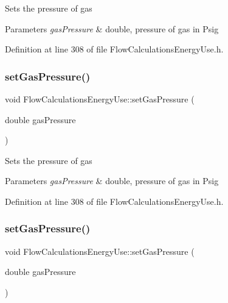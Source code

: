 Sets the pressure of gas


\begin{DoxyParams}{Parameters}
{\em gas\+Pressure} & double, pressure of gas in Psig \\
\hline
\end{DoxyParams}


Definition at line 308 of file Flow\+Calculations\+Energy\+Use.\+h.

\mbox{\label{class_flow_calculations_energy_use_a3b87a7c24340c618ed62ced5aece36b2}} 
\subsubsection{\texorpdfstring{set\+Gas\+Pressure()}{setGasPressure()}\hspace{0.1cm}{\footnotesize\ttfamily [2/3]}}
{\footnotesize\ttfamily void Flow\+Calculations\+Energy\+Use\+::set\+Gas\+Pressure (\begin{DoxyParamCaption}\item[{double}]{gas\+Pressure }\end{DoxyParamCaption})\hspace{0.3cm}{\ttfamily [inline]}}

Sets the pressure of gas


\begin{DoxyParams}{Parameters}
{\em gas\+Pressure} & double, pressure of gas in Psig \\
\hline
\end{DoxyParams}


Definition at line 308 of file Flow\+Calculations\+Energy\+Use.\+h.

\mbox{\label{class_flow_calculations_energy_use_a3b87a7c24340c618ed62ced5aece36b2}} 
\subsubsection{\texorpdfstring{set\+Gas\+Pressure()}{setGasPressure()}\hspace{0.1cm}{\footnotesize\ttfamily [3/3]}}
{\footnotesize\ttfamily void Flow\+Calculations\+Energy\+Use\+::set\+Gas\+Pressure (\begin{DoxyParamCaption}\item[{double}]{gas\+Pressure }\end{DoxyParamCaption})\hspace{0.3cm}{\ttfamily [inline]}}

